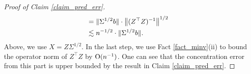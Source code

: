 \begin{proof}[Proof of Claim \ref{claim_pred_err}]
\begin{align*}
		&=   \|\Sigma^{1/2} b \|  \cdot \left\| (Z^\top Z)^{-1}\right\|^{1/2}  \\
		& \lesssim n^{-1/2} \cdot \|\Sigma^{1/2} b\|.
	\end{align*}
	Above, we use $X=Z\Sigma^{1/2}$. In the last step, we use Fact \ref{fact_minv}(ii) to bound the operator norm of $Z^\top Z$ by $\operatorname{O}(n^{-1})$. %
	One can see that the concentration error from this part is upper bounded by the result in Claim \ref{claim_pred_err}.
	
	\iffalse
	Next, we use the fact that the spectral norm of $\cE$ is at most $\sigma \cdot p^{\e}$.
	Hence, the spectral norm of $\Sigma^{1/2} E_i$ is at most
		\[ \sigma \cdot p^{\e} \cdot \norm{\Sigma^{1/2} (X^{\top} X)^{-1} X^{\top}} \cdot \norm{\hat{a}_i}. \]
	Therefore, the cross term is bounded by $\sigma \cdot p^{\e}$ times
	\begin{align*}
			& \bignorm{\Sigma^{1/2} (B^{\star} \hat{a}_i - \beta_i)} \cdot \norm{\Sigma^{1/2} (X^{\top} X)^{-1} X^{\top}} \cdot \norm{\hat{a}_i} \\
		\le & \bignorm{\Sigma^{1/2} (B^{\star} \hat{a}_i - \beta_i)}^2 + \norm{\hat{a}_i}^2 \cdot \bignorm{\Sigma^{1/2} (X^{\top} X)^{-1} X^{\top}}^2 \tag{by Cauchy-Shwartz inequality} \\
		\le & \bignorm{\Sigma^{1/2}(B^{\star} \hat{a}_i - \beta_i)} + \norm{\hat{a}_i}^2 \cdot \bigtr{\Sigma (X^{\top} X)^{-1}}.
	\end{align*}
	\fi


\end{proof}
